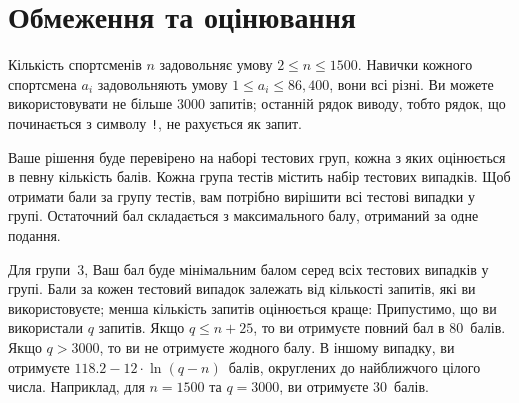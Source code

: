 \section*{Обмеження та оцінювання}

Кількість спортсменів $n$ задовольняє умову
$2\leq n\leq 1500$. %
Навички кожного спортсмена $a_i$ задовольняють умову
$1\leq a_i\leq 86,400$, %
вони всі різні. %
Ви можете використовувати
не більше 3000 запитів; %
останній рядок виводу, тобто рядок, що починається з символу \texttt{!}, не рахується як запит.

Ваше рішення буде перевірено на наборі тестових груп, кожна з яких оцінюється в певну кількість балів.
Кожна група тестів містить набір тестових випадків.
Щоб отримати бали за групу тестів, вам потрібно вирішити всі тестові випадки у групі.
Остаточний бал складається з максимального балу, отриманий за одне подання.

Для групи~$3$, Ваш бал буде мінімальним балом серед всіх тестових випадків у групі.
Бали за кожен тестовий випадок залежать від кількості запитів, які ви використовуєте;
менша кількість запитів оцінюється краще:
Припустимо, що ви використали $q$ запитів.
Якщо $q \le n+25$, то ви отримуєте повний бал в $80$~балів.
Якщо $q > 3000$, то ви не отримуєте жодного балу.
В іншому випадку, ви отримуєте
$118.2 - 12 \cdot \ln(q - n)$~балів, округлених до найближчого цілого числа. %
Наприклад, для $n = 1500$ та $q = 3000$, ви отримуєте $30$~балів.

